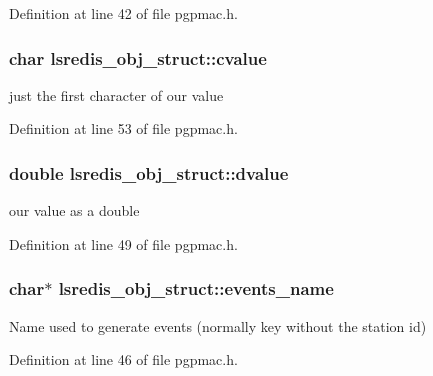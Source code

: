 Definition at line 42 of file pgpmac.\-h.

\hypertarget{structlsredis__obj__struct_a4a5933dbd44d33d9f594f6020a443b69}{
\subsubsection[{cvalue}]{\setlength{\rightskip}{0pt plus 5cm}char lsredis\-\_\-obj\-\_\-struct\-::cvalue}}\label{structlsredis__obj__struct_a4a5933dbd44d33d9f594f6020a443b69}


just the first character of our value 



Definition at line 53 of file pgpmac.\-h.

\hypertarget{structlsredis__obj__struct_ab60d0a71cabad6b921b6edb5a8f68996}{
\subsubsection[{dvalue}]{\setlength{\rightskip}{0pt plus 5cm}double lsredis\-\_\-obj\-\_\-struct\-::dvalue}}\label{structlsredis__obj__struct_ab60d0a71cabad6b921b6edb5a8f68996}


our value as a double 



Definition at line 49 of file pgpmac.\-h.

\hypertarget{structlsredis__obj__struct_ad0a987a011b580eab739cda831f78fbb}{
\subsubsection[{events\-\_\-name}]{\setlength{\rightskip}{0pt plus 5cm}char$\ast$ lsredis\-\_\-obj\-\_\-struct\-::events\-\_\-name}}\label{structlsredis__obj__struct_ad0a987a011b580eab739cda831f78fbb}


Name used to generate events (normally key without the station id) 



Definition at line 46 of file pgpmac.\-h.

